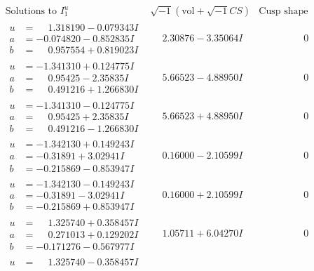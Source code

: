 \documentclass[1p]{elsarticle_modified}
\theoremstyle{definition}
\newcommand{\I}{\sqrt{-1}}
\begin{document}
$$\begin{array}{c|c|c}
\text{Solutions to }I^u_{1}& \I (\text{vol} + \sqrt{-1}CS) & \text{Cusp shape}\\
 \hline 
\begin{aligned}
u &= \phantom{-}1.318190 - 0.079343 I \\
a &= -0.074820 - 0.852835 I \\
b &= \phantom{-}0.957554 + 0.819023 I\end{aligned}
 & \phantom{-}2.30876 - 3.35064 I & \phantom{-0.000000 } 0 \\ \hline\begin{aligned}
u &= -1.341310 + 0.124775 I \\
a &= \phantom{-}0.95425 - 2.35835 I \\
b &= \phantom{-}0.491216 + 1.266830 I\end{aligned}
 & \phantom{-}5.66523 - 4.88950 I & \phantom{-0.000000 } 0 \\ \hline\begin{aligned}
u &= -1.341310 - 0.124775 I \\
a &= \phantom{-}0.95425 + 2.35835 I \\
b &= \phantom{-}0.491216 - 1.266830 I\end{aligned}
 & \phantom{-}5.66523 + 4.88950 I & \phantom{-0.000000 } 0 \\ \hline\begin{aligned}
u &= -1.342130 + 0.149243 I \\
a &= -0.31891 + 3.02941 I \\
b &= -0.215869 - 0.853947 I\end{aligned}
 & \phantom{-}0.16000 - 2.10599 I & \phantom{-0.000000 } 0 \\ \hline\begin{aligned}
u &= -1.342130 - 0.149243 I \\
a &= -0.31891 - 3.02941 I \\
b &= -0.215869 + 0.853947 I\end{aligned}
 & \phantom{-}0.16000 + 2.10599 I & \phantom{-0.000000 } 0 \\ \hline\begin{aligned}
u &= \phantom{-}1.325740 + 0.358457 I \\
a &= \phantom{-}0.271013 + 0.129202 I \\
b &= -0.171276 - 0.567977 I\end{aligned}
 & \phantom{-}1.05711 + 6.04270 I & \phantom{-0.000000 } 0 \\ \hline\begin{aligned}
u &= \phantom{-}1.325740 - 0.358457 I \\

\end{aligned}
\end{array}$$
\end{document}
